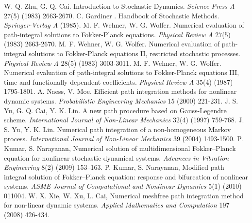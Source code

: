 \documentclass[a4paper, 11pt, final]{article}
\begin{document}
\begin{thebibliography}{aaa}
    W. Q. Zhu, G. Q. Cai. Introduction to Stochastic Dynamics.
    \textsl{Science Press A} 27(5) (1983) 2663-2670.
    C. Gardiner . Handbook of Stochastic Methods. 
    \textsl{Springer-Verlag A} (1985).
    M. F. Wehner, W. G. Wolfer. Numerical evaluation of path-integral solutions to Fokker-Planck equations. 
    \textsl{Physical Review A} 27(5) (1983) 2663-2670.
    M. F. Wehner, W. G. Wolfer. Numerical evaluation of path-integral solutions to Fokker-Planck equations II, restricted stochastic processes. 
    \textsl{Physical Review A} 28(5) (1983) 3003-3011.
    M. F. Wehner, W. G. Wolfer. Numerical evaluation of path-integral solutions to Fokker-Planck equations III, time and functionally dependent coefficients. 
    \textsl{Physical Review A} 35(4) (1987) 1795-1801.
    A. Naess, V. Moe. Efficient path integration methods for nonlinear dynamic systems. 
    \textsl{Probabilistic Engineering Mechanics} 15 (2000) 221-231.
    J. S. Yu, G. Q. Cai, Y. K. Lin. A new path procedure based on Gauss-Legendre scheme. 
    \textsl{International Journal of Non-Linear Mechanics} 32(4) (1997) 759-768.
     J. S. Yu, Y. K. Lin. Numerical path integration of a non-homogeneous Markov process. 
    \textsl{International Journal of Non-Linear Mechanics} 39 (2004) 1493-1500.
     P. Kumar, S. Narayanan, Numerical solution of multidimensional Fokker–Planck equation for nonlinear stochastic dynamical systems.
    \textsl{Advances in Vibration Engineering} 8(2) (2009) 153–163.
     P. Kumar, S. Narayanan, Modified path integral solution of Fokker–Planck equation: response and bifurcation of nonlinear systems.
    \textsl{ASME Journal of Computational and Nonlinear Dynamics} 5(1) (2010) 011004.
     W. X. Xie, W. Xu, L. Cai, Numerical meshfree path integration method for non-linear dynamic systems.
    \textsl{Applied Mathematics and Computation} 197 (2008) 426-434.


\end{thebibliography}
\end{document}
